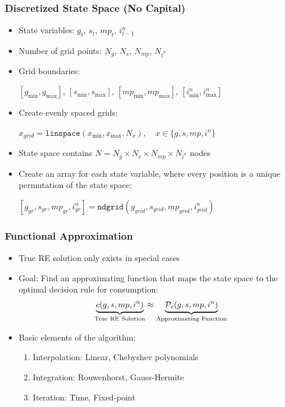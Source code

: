 \documentclass[11pt]{beamer}
\begin{document}
\begin{frame}\frametitle{Discretized State Space (No Capital)}

\begin{itemize}\setlength{\itemsep}{10pt}
  \item State variables: $g_t$, $s_t$, $mp_t$, $i^n_{t-1}$
  \item Number of grid points: $N_g$, $N_{s}$, $N_{mp}$, $N_{i^n}$
  \item Grid boundaries: 
\begin{center}
$[g_{\min},g_{\max}]$, $[s_{\min},s_{\max}]$, $[mp_{\min},mp_{\max}]$, $[i^n_{\min},i^n_{\max}]$
\end{center}
  \item Create evenly spaced grids:
  \begin{center}
    $x_{grid} = \texttt{linspace}(x_{\min},x_{\max},N_x), \quad x\in\{g,s,mp,i^n\}$
  \end{center}
  \item State space contains $N=N_g\times N_s\times N_{mp}\times N_{i^n}$ nodes
  \item Create an array for each state variable, where every position is a unique permutation of the state space:
  \begin{center}
    $[g_{gr},s_{gr},mp_{gr},i^n_{gr}] = \texttt{ndgrid}(g_{grid},s_{grid},mp_{grid},i^n_{grid})$
  \end{center}
\end{itemize}

\end{frame}

\begin{frame}\frametitle{Functional Approximation}

\begin{itemize}\setlength{\itemsep}{12pt}
  \item True RE solution only exists in special cases %
  \item Goal: Find an approximating function that maps the state space to the optimal decision rule for consumption:
  \begin{gather*}
    \underbrace{c(g,s,mp,i^n)}_{\textrm{True RE Solution}} \approx \underbrace{{\cal{P}}_c(g,s,mp,i^n)}_{\textrm{Approximating Function}}
  \end{gather*}
  \item Basic elements of the algorithm:
  \begin{enumerate}\setlength{\itemsep}{6pt}
    \item Interpolation: Linear, Chebyshev polynomials %
    \item Integration: Rouwenhorst, Gauss-Hermite %
    \item Iteration: Time, Fixed-point 
  \end{enumerate}
\end{itemize}

\end{frame}
\end{document}
